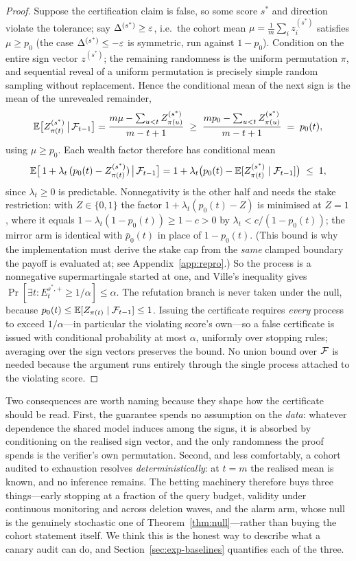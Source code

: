 \begin{proof}
Suppose the certification claim is false, so some score $s^\ast$ and direction violate
the tolerance; say $\Delta^{(s^\ast)} \ge \varepsilon$, i.e.\ the cohort mean
$\mu = \tfrac1m\sum_i z_i^{(s^\ast)}$ satisfies $\mu \ge p_0$ (the case
$\Delta^{(s^\ast)} \le -\varepsilon$ is symmetric, run against $1-p_0$). Condition on the
entire sign vector $z^{(s^\ast)}$; the remaining randomness is the uniform
permutation $\pi$, and sequential reveal of a uniform permutation is precisely simple
random sampling without replacement. Hence the conditional mean of the next sign is
the mean of the unrevealed remainder,
\[
\mathbb{E}\bigl[Z^{(s^\ast)}_{\pi(t)} \,\big|\, \mathcal{F}_{t-1}\bigr]
= \frac{m\mu - \sum_{u<t} Z^{(s^\ast)}_{\pi(u)}}{m-t+1}
\;\ge\; \frac{m p_0 - \sum_{u<t} Z^{(s^\ast)}_{\pi(u)}}{m-t+1}
\;=\; p_0(t),
\]
using $\mu \ge p_0$. Each wealth factor therefore has conditional mean
\[
\mathbb{E}\bigl[\,1 + \lambda_t\,(p_0(t) - Z^{(s^\ast)}_{\pi(t)}) \,\big|\, \mathcal{F}_{t-1}\bigr]
= 1 + \lambda_t\bigl(p_0(t) - \mathbb{E}[Z^{(s^\ast)}_{\pi(t)} \mid \mathcal{F}_{t-1}]\bigr) \;\le\; 1,
\]
since $\lambda_t \ge 0$ is predictable. Nonnegativity is the other half and needs the
stake restriction: with $Z \in \{0,1\}$ the factor $1 + \lambda_t(p_0(t) - Z)$ is
minimised at $Z = 1$, where it equals $1 - \lambda_t(1 - p_0(t)) \ge 1 - c > 0$ by
$\lambda_t < c/(1-p_0(t))$; the mirror arm is identical with $\bar p_0(t)$ in place of
$1 - p_0(t)$. (This bound is why the implementation must derive the stake cap from the
\emph{same} clamped boundary the payoff is evaluated at; see
Appendix~\ref{app:repro}.) So the process is a nonnegative supermartingale started at
one, and Ville's inequality gives
$\Pr[\exists t: E_t^{s^\ast,+} \ge 1/\alpha] \le \alpha$. The refutation branch is
never taken under the null, because $p_0(t) \le \mathbb{E}[Z_{\pi(t)}\mid\mathcal{F}_{t-1}] \le 1$.
Issuing the certificate requires \emph{every} process to exceed $1/\alpha$---in
particular the violating score's own---so a false certificate is issued with
conditional probability at most $\alpha$, uniformly over stopping rules; averaging
over the sign vectors preserves the bound. No union bound over $\mathcal{F}$ is needed because
the argument runs entirely through the single process attached to the violating
score.
\end{proof}

Two consequences are worth naming because they shape how the certificate should be
read. First, the guarantee spends no assumption on the \emph{data}: whatever
dependence the shared model induces among the signs, it is absorbed by conditioning on
the realised sign vector, and the only randomness the proof spends is the verifier's
own permutation. Second, and less comfortably, a cohort audited to exhaustion resolves
\emph{deterministically}: at $t=m$ the realised mean is known, and no inference
remains. The betting machinery therefore buys three things---early stopping at a
fraction of the query budget, validity under continuous monitoring and across
deletion waves, and the alarm arm, whose null is the genuinely stochastic one of
Theorem~\ref{thm:null}---rather than buying the cohort statement itself. We think
this is the honest way to describe what a canary audit can do, and
Section~\ref{sec:exp-baselines} quantifies each of the three.


